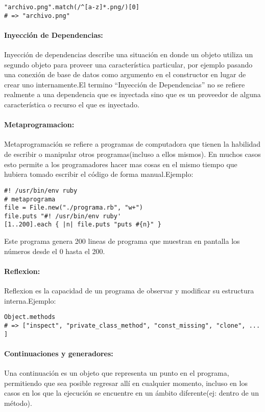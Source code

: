 \begin{verbatim}
"archivo.png".match(/^[a-z]*.png/)[0]
# => "archivo.png"
\end{verbatim}

\paragraph{Inyección de Dependencias:}
Inyección de dependencias describe una situación en donde un objeto utiliza un segundo objeto para proveer una característica particular, por ejemplo pasando una conexión de base de datos como argumento en el constructor en lugar de crear uno internamente.\newline El termino ``Inyección de Dependencias'' no se refiere realmente a una dependencia que es inyectada sino que es un proveedor de alguna característica o recurso el que es inyectado.

\paragraph{Metaprogramacion:}
Metaprogramación se refiere a programas de computadora que tienen la habilidad de escribir o manipular otros programas(incluso a ellos mismos). En muchos casos esto permite a los programadores hacer mas cosas en el mismo tiempo que hubiera tomado escribir el código de forma manual.\newline Ejemplo:

\begin{verbatim}
#! /usr/bin/env ruby
# metaprograma
file = File.new("./programa.rb", "w+")
file.puts "#! /usr/bin/env ruby'
[1..200].each { |n| file.puts "puts #{n}" }
\end{verbatim}

Este programa genera 200 lineas de programa que muestran en pantalla los números desde el 0 hasta el 200.

\paragraph{Reflexion:}
Reflexion es la capacidad de un programa de observar y modificar su estructura interna.\newline Ejemplo:

\begin{verbatim}
Object.methods
# => ["inspect", "private_class_method", "const_missing", "clone", ... ]
\end{verbatim}

\paragraph{Continuaciones y generadores:}
Una continuación es un objeto que representa un punto en el programa, permitiendo que sea posible regresar allí en cualquier momento, incluso en los casos en los que la ejecución se encuentre en un ámbito diferente(ej: dentro de un método).

